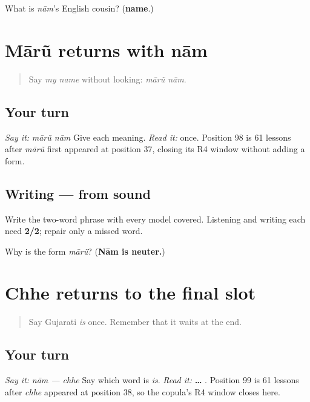 \begin{tcolorbox}[breakable,colback=teal!4,colframe=teal!35!black,title={Before you move on}]
What is \emph{nām}'s English cousin? (\textbf{name}.)
\end{tcolorbox}
\section[Practice]{Mārũ returns with nām}

\label{lesson:GU-R16-maarun-r4}



\begin{quote}
Say \emph{my name} without looking: \emph{mārũ nām}.
\end{quote}

\subsection*{Your turn}
\emph{Say it:} \emph{mārũ nām} Give each meaning. \emph{Read it:} \textbf{ } once. Position 98 is 61 lessons after \emph{mārũ} first appeared at position 37, closing its R4 window without adding a form.

\subsection*{Writing — from sound}
Write the two-word phrase with every model covered. Listening and writing each need \textbf{2/2}; repair only a missed word.

\begin{tcolorbox}[breakable,colback=teal!4,colframe=teal!35!black,title={Before you move on}]
Why is the form \emph{mārũ}? (\textbf{Nām is neuter.})
\end{tcolorbox}
\section[Practice]{Chhe returns to the final slot}

\label{lesson:GU-R16-chhe-r4}



\begin{quote}
Say Gujarati \emph{is} once. Remember that it waits at the end.
\end{quote}

\subsection*{Your turn}
\emph{Say it:} \emph{nām — chhe} Say which word is \emph{is}. \emph{Read it:} \textbf{ … }. Position 99 is 61 lessons after \emph{chhe} appeared at position 38, so the copula's R4 window closes here.

